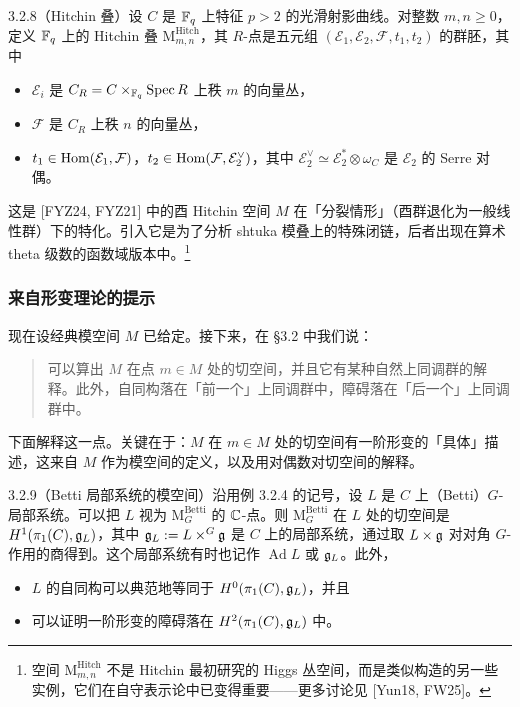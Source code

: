 \begin{exam}{3.2.8}（Hitchin 叠）设 $C$ 是 $\mathbb{F}_q$ 上特征 $p>2$ 的光滑射影曲线。对整数 $m,n\ge0$，定义 $\mathbb{F}_q$ 上的 Hitchin 叠 $\mathrm{M}^{\mathrm{Hitch}}_{m,n}$，其 $R$-点是五元组 $(\mathcal E_1,\mathcal E_2,\mathcal F,t_1,t_2)$ 的群胚，其中
\begin{itemize}
\item $\mathcal E_i$ 是 $C_R=C\times_{\mathbb{F}_q}\operatorname{Spec} R$ 上秩 $m$ 的向量丛，
\item $\mathcal F$ 是 $C_R$ 上秩 $n$ 的向量丛，
\item $t_1\in\operatorname{Hom}(\mathcal E_1,\mathcal F)$，$t_2\in\operatorname{Hom}(\mathcal F,\mathcal E_2^\vee)$，其中 $\mathcal E_2^\vee\simeq\mathcal E_2^*\otimes\omega_C$ 是 $\mathcal E_2$ 的 Serre 对偶。
\end{itemize}
这是 [FYZ24, FYZ21] 中的酉 Hitchin 空间 $M$ 在「分裂情形」（酉群退化为一般线性群）下的特化。引入它是为了分析 shtuka 模叠上的特殊闭链，后者出现在算术 theta 级数的函数域版本中。\footnote{空间 $\mathrm{M}^{\mathrm{Hitch}}_{m,n}$ 不是 Hitchin 最初研究的 Higgs 丛空间，而是类似构造的另一些实例，它们在自守表示论中已变得重要——更多讨论见 [Yun18, FW25]。}
\end{exam}

\subsubsection{来自形变理论的提示}

现在设经典模空间 $M$ 已给定。接下来，在 §3.2 中我们说：
\begin{quote}
可以算出 $M$ 在点 $m\in M$ 处的切空间，并且它有某种自然上同调群的解释。此外，自同构落在「前一个」上同调群中，障碍落在「后一个」上同调群中。
\end{quote}
下面解释这一点。关键在于：$M$ 在 $m\in M$ 处的切空间有一阶形变的「具体」描述，这来自 $M$ 作为模空间的定义，以及用对偶数对切空间的解释。

\begin{exam}{3.2.9}（Betti 局部系统的模空间）沿用例 3.2.4 的记号，设 $L$ 是 $C$ 上（Betti）$G$-局部系统。可以把 $L$ 视为 $\mathrm{M}^{\mathrm{Betti}}_G$ 的 $\mathbb{C}$-点。则 $\mathrm{M}^{\mathrm{Betti}}_G$ 在 $L$ 处的切空间是 $H^1(\pi_1(C),\mathfrak{g}_L)$，其中 $\mathfrak{g}_L:=L\times^G\mathfrak{g}$ 是 $C$ 上的局部系统，通过取 $L\times\mathfrak{g}$ 对对角 $G$-作用的商得到。这个局部系统有时也记作 $\operatorname{Ad}L$ 或 $\mathfrak{g}_L$。此外，
\begin{itemize}
\item $L$ 的自同构可以典范地等同于 $H^0(\pi_1(C),\mathfrak{g}_L)$，并且
\item 可以证明一阶形变的障碍落在 $H^2(\pi_1(C),\mathfrak{g}_L)$ 中。
\end{itemize}
\end{exam}

